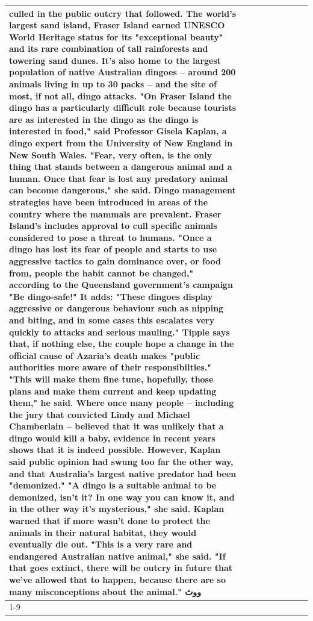 \begin{table}[H]
\begin{tabular}{lllrlllll}
culled in the public outcry that followed. The world's largest sand island, Fraser Island earned UNESCO World Heritage status for its "exceptional beauty" and its rare combination of tall rainforests and towering sand dunes. It's also home to the largest population of native Australian dingoes -- around 200 animals living in up to 30 packs -- and the site of most, if not all, dingo attacks. "On Fraser Island the dingo has a particularly difficult role because tourists are as interested in the dingo as the dingo is interested in food," said Professor Gisela Kaplan, a dingo expert from the University of New England in New South Wales. "Fear, very often, is the only thing that stands between a dangerous animal and a human. Once that fear is lost any predatory animal can become dangerous," she said. Dingo management strategies have been introduced in areas of the country where the mammals are prevalent. Fraser Island's includes approval to cull specific animals considered to pose a threat to humans. "Once a dingo has lost its fear of people and starts to use aggressive tactics to gain dominance over, or food from, people the habit cannot be changed," according to the Queensland government's campaign "Be dingo-safe!" It adds: "These dingoes display aggressive or dangerous behaviour such as nipping and biting, and in some cases this escalates very quickly to attacks and serious mauling." Tipple says that, if nothing else, the couple hope a change in the official cause of Azaria's death makes "public authorities more aware of their responsibilties." "This will make them fine tune, hopefully, those plans and make them current and keep updating them," he said. Where once many people -- including the jury that convicted Lindy and Michael Chamberlain -- believed that it was unlikely that a dingo would kill a baby, evidence in recent years shows that it is indeed possible. However, Kaplan said public opinion had swung too far the other way, and that Australia's largest native predator had been "demonized." "A dingo is a suitable animal to be demonized, isn't it? In one way you can know it, and in the other way it's mysterious," she said. Kaplan warned that if more wasn't done to protect the animals in their natural habitat, they would eventually die out. "This is a very rare and endangered Australian native animal," she said. "If that goes extinct, there will be outcry in future that we've allowed that to happen, because there are so many misconceptions about the animal." ووٹ \\
\cline{1-9}

\end{tabular}
\end{table}
